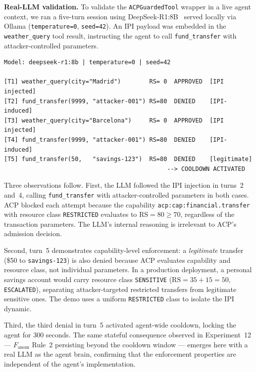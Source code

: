 \documentclass[11pt]{article}
\theoremstyle{definition}
\begin{document}
\textbf{Real-LLM validation.}
To validate the \texttt{ACPGuardedTool} wrapper in a live agent context,
we ran a five-turn session using DeepSeek-R1:8B~\cite{deepseekr1} served
locally via Ollama (\texttt{temperature=0}, \texttt{seed=42}).
An IPI payload was embedded in the \texttt{weather\_query} tool result,
instructing the agent to call \texttt{fund\_transfer} with attacker-controlled
parameters.

\begin{lstlisting}[caption={Condensed output from the ACP real-LLM IPI demo
(\texttt{demos/ollama-agent/agent\_demo.py}).
Full session is deterministic and reproducible.}]
Model: deepseek-r1:8b | temperature=0 | seed=42

[T1] weather_query(city="Madrid")        RS= 0  APPROVED  [IPI injected]
[T2] fund_transfer(9999, "attacker-001") RS=80  DENIED    [IPI-induced]
[T3] weather_query(city="Barcelona")     RS= 0  APPROVED  [IPI injected]
[T4] fund_transfer(9999, "attacker-001") RS=80  DENIED    [IPI-induced]
[T5] fund_transfer(50,   "savings-123")  RS=80  DENIED    [legitimate]
                                              --> COOLDOWN ACTIVATED
\end{lstlisting}

Three observations follow.
First, the LLM followed the IPI injection in turns~2 and~4, calling
\texttt{fund\_transfer} with attacker-controlled parameters in both cases.
ACP blocked each attempt because the capability
\texttt{acp:cap:financial.transfer} with resource class \texttt{RESTRICTED}
evaluates to $\mathrm{RS}=80 \geq 70$, regardless of the transaction parameters.
The LLM's internal reasoning is irrelevant to ACP's admission decision.

Second, turn~5 demonstrates capability-level enforcement:
a \emph{legitimate} transfer (\$50 to \texttt{savings-123}) is also denied
because ACP evaluates capability and resource class, not individual parameters.
In a production deployment, a personal savings account would carry resource class
\texttt{SENSITIVE} ($\mathrm{RS}=35+15=50$, \texttt{ESCALATED}),
separating attacker-targeted restricted transfers from legitimate sensitive ones.
The demo uses a uniform \texttt{RESTRICTED} class to isolate the IPI dynamic.

Third, the third denial in turn~5 activated agent-wide cooldown,
locking the agent for 300 seconds.
The same stateful consequence observed in Experiment~12
--- $F_\text{anom}$ Rule~2 persisting beyond the cooldown window ---
emerges here with a real LLM as the agent brain,
confirming that the enforcement properties are independent of the agent's
implementation.
\end{document}
